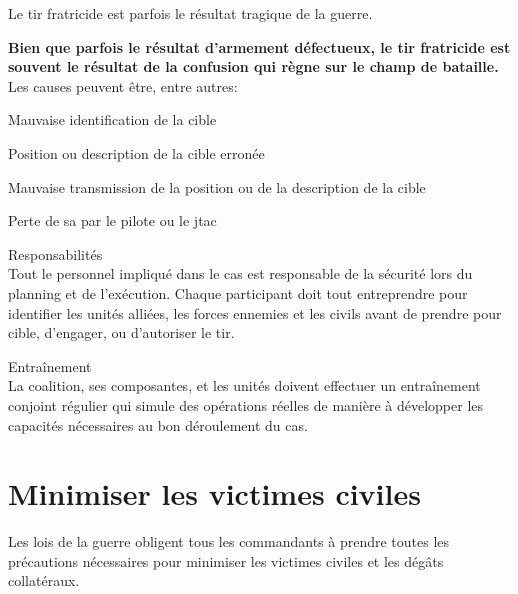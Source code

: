 \begin{e1}
	\item Le tir fratricide est parfois le résultat tragique de la guerre.
	\item
	\textbf{Bien que parfois le résultat d'armement défectueux, le tir fratricide est souvent le résultat de la confusion qui règne sur le champ de bataille.}
	Les causes peuvent être, entre autres:
	\begin{e2}
		\item Mauvaise identification de la cible
		\item Position ou description de la cible erronée
		\item Mauvaise transmission de la position ou de la description de la cible
		\item Perte de \gls{sa} par le pilote ou le \gls{jtac}
	\end{e2}
	\item Responsabilités \\
	Tout le personnel impliqué dans le \gls{cas} est responsable de la sécurité lors du planning et de l'exécution. Chaque participant doit tout entreprendre pour identifier les unités alliées, les forces ennemies et les civils avant de prendre pour cible, d'engager, ou d'autoriser le tir.
	\item Entraînement \\
	La coalition, ses composantes, et les unités doivent effectuer un entraînement conjoint régulier qui simule des opérations réelles de manière à développer les capacités nécessaires au bon déroulement du \gls{cas}.	
\end{e1}

\section{Minimiser les victimes civiles}
\begin{e1}
	\item Les lois de la guerre obligent tous les commandants à prendre toutes les précautions nécessaires pour minimiser les victimes civiles et les dégâts collatéraux.
\end{e1}
